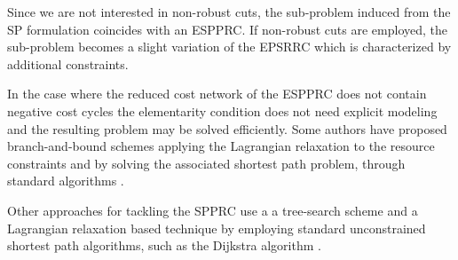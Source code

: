Since we are not interested in non-robust cuts, the sub-problem
induced from the SP formulation coincides with an ESPPRC.
If non-robust cuts are employed, the sub-problem becomes
a slight variation of the EPSRRC which is characterized by additional constraints.

\medskip

In the case where the reduced cost network of the ESPPRC does not contain negative cost cycles
the elementarity condition does not need explicit modeling
and the resulting problem may be solved efficiently.
Some authors have proposed branch-and-bound
schemes applying the Lagrangian relaxation to the resource constraints
and by solving the associated shortest path
problem, through standard algorithms \parencite{beasley1989, carlyle2008}.

Other approaches for tackling the SPPRC use a
a tree-search scheme and a Lagrangian relaxation based
technique by employing standard unconstrained shortest path
algorithms, such as the Dijkstra algorithm \parencite{beasley1989}.

\medskip

\begin{comment}
\cite{bettinelli2010mathematical} ---------------
It is possible to address the pricing problem by optimizing its relaxation,
obtained by dropping the elementarity constraints. Solving a resource con-
strained shortest path problem (RCSPP) requires less computing time but
yields less tight lower bounds, since columns may include cycles. The two
different approaches have been followed for instance by Feillet et al. [42] and
Desrochers et al. [29] to solve the vehicle routing problem with time windows
(VRPTW) through column generation.
\end{comment}

